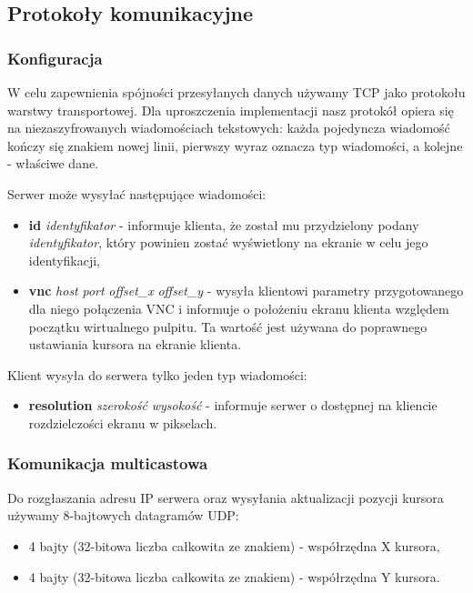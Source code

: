   \subsection{Protokoły komunikacyjne}

    \subsubsection{Konfiguracja}

      W celu zapewnienia spójności przesyłanych danych używamy TCP jako protokołu warstwy transportowej. Dla uproszczenia implementacji nasz protokół opiera się na niezaszyfrowanych wiadomościach tekstowych: każda pojedyncza wiadomość kończy się znakiem nowej linii, pierwszy wyraz oznacza typ wiadomości, a kolejne - właściwe dane.

      Serwer może wysyłać następujące wiadomości:
      \begin{itemize}[nolistsep]
        \item \textbf{id} \emph{identyfikator} - informuje klienta, że został mu przydzielony podany \emph{identyfikator}, który powinien zostać wyświetlony na ekranie w celu jego identyfikacji,
        \item \textbf{vnc} \emph{host} \emph{port} \emph{offset\_x} \emph{offset\_y} - wysyła klientowi parametry przygotowanego dla niego połączenia VNC i informuje o położeniu ekranu klienta względem początku wirtualnego pulpitu. Ta wartość jest używana do poprawnego ustawiania kursora na ekranie klienta.
      \end{itemize}

      Klient wysyła do serwera tylko jeden typ wiadomości:
      \begin{itemize}[nolistsep]
        \item \textbf{resolution} \emph{szerokość} \emph{wysokość} - informuje serwer o dostępnej na kliencie rozdzielczości ekranu w pikselach.
      \end{itemize}

    \subsubsection{Komunikacja multicastowa}

      Do rozgłaszania adresu IP serwera oraz wysyłania aktualizacji pozycji kursora używamy 8-bajtowych datagramów UDP:
      \begin{itemize}[nolistsep]
        \item 4 bajty (32-bitowa liczba całkowita ze znakiem) - współrzędna X kursora,
        \item 4 bajty (32-bitowa liczba całkowita ze znakiem) - współrzędna Y kursora.
      \end{itemize}

